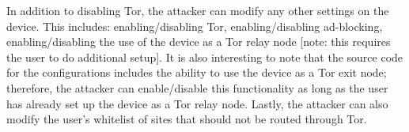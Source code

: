 In addition to disabling Tor, the attacker can modify any other settings on the device.  This includes: enabling/disabling Tor, enabling/disabling ad-blocking, enabling/disabling the use of the device as a Tor relay node [note: this requires the user to do additional setup].  It is also interesting to note that the source code for the configurations includes the ability to use the device as a Tor exit node; therefore, the attacker can enable/disable this functionality as long as the user has already set up the device as a Tor relay node.  Lastly, the attacker can also modify the user's whitelist of sites that should not be routed through Tor.  


